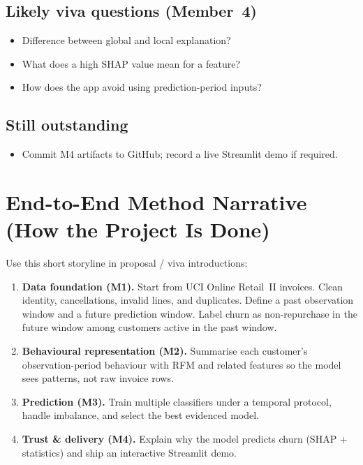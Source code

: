 \documentclass[11pt,a4paper]{article}
\begin{document}
\subsection{Likely viva questions (Member~4)}
\begin{itemize}
  \item Difference between global and local explanation?
  \item What does a high SHAP value mean for a feature?
  \item How does the app avoid using prediction-period inputs?
\end{itemize}

\subsection{Still outstanding}
\begin{itemize}
  \item Commit M4 artifacts to GitHub; record a live Streamlit demo if required.
\end{itemize}

\newpage
\section{End-to-End Method Narrative (How the Project Is Done)}

Use this short storyline in proposal / viva introductions:

\begin{enumerate}
  \item \textbf{Data foundation (M1).}
        Start from UCI Online Retail~II invoices. Clean identity, cancellations,
        invalid lines, and duplicates. Define a past observation window and a
        future prediction window. Label churn as non-repurchase in the future
        window among customers active in the past window.
  \item \textbf{Behavioural representation (M2).}
        Summarise each customer's observation-period behaviour with RFM and
        related features so the model sees patterns, not raw invoice rows.
  \item \textbf{Prediction (M3).}
        Train multiple classifiers under a temporal protocol, handle imbalance,
        and select the best evidenced model.
  \item \textbf{Trust \& delivery (M4).}
        Explain why the model predicts churn (SHAP + statistics) and ship an
        interactive Streamlit demo.
\end{enumerate}
\end{document}
